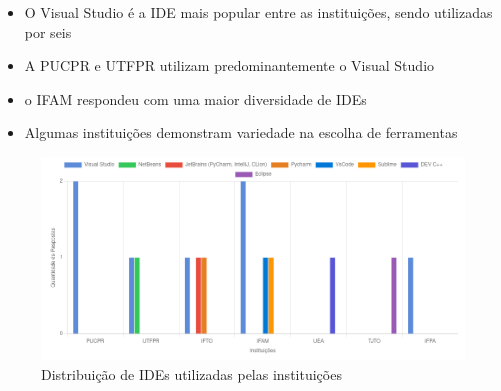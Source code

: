 \begin{itemize}
    \item O Visual Studio é a IDE mais popular entre as instituições, sendo utilizadas por seis
    \item A PUCPR e UTFPR utilizam predominantemente o Visual Studio
    \item o IFAM respondeu com uma maior diversidade de IDEs
    \item Algumas instituições demonstram variedade na escolha de ferramentas
\end{itemize}
\begin{figure}[!ht]
    \centering
    \includegraphics[width=1\linewidth]{../figuras/IDEs.png}
    \caption{Distribuição de IDEs utilizadas pelas instituições}
    \label{fig:ide}
\end{figure}